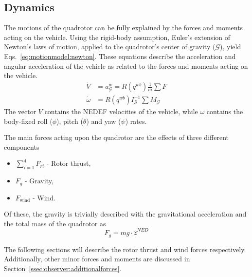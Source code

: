     \subsection{Dynamics}
        The motions of the quadrotor can be fully explained by the
        forces and moments acting on the vehicle. Using the rigid-body assumption,
        Euler's extension of Newton's laws of motion, applied to the
        quadrotor's center of gravity ($\mathcal{G}$), yield Eqs.~\eqref{eq:motionmodel:newton}.
        These equations describe the acceleration and angular acceleration of the vehicle
        as related to the forces and moments acting on the vehicle.
        \begin{subequations}
        \label{eq:motionmodel:newton}
            \begin{align}
                \dot{V} &= a^{w}_{\mathcal{G}} = R(q^{wb})\frac{1}{m}\sum F \\
                \dot{\omega} &= R(q^{wb})I_{\mathcal{G}}^{-1}\sum M_{\mathcal{G}}
            \end{align}
        \end{subequations}
        The vector $V$ contains the NEDEF velocities of the vehicle, while $\omega${}
        contains the body-fixed roll ($\phi$), pitch ($\theta$) and yaw ($\psi$) rates.

        The main forces acting upon the quadrotor are the effects of three different components
        \begin{itemize}
            \item $\sum_{i=1}^{4}F_{ri}$ - Rotor thrust,
            \item $F_{g}$ - Gravity,
            \item $F_{\text{wind}}$ - Wind.
        \end{itemize}

        Of these, the gravity is trivially described with the
        gravitational acceleration and the total mass of the quadrotor as
        \begin{equation}
            F_{g} = mg\cdot \hat{z}^{NED}
        \end{equation}

        The following sections will describe the rotor thrust and wind forces respectively.
        Additionally, other minor forces and moments are discussed in
        Section~\ref{ssec:observer:additionalforces}.

        
        
        
